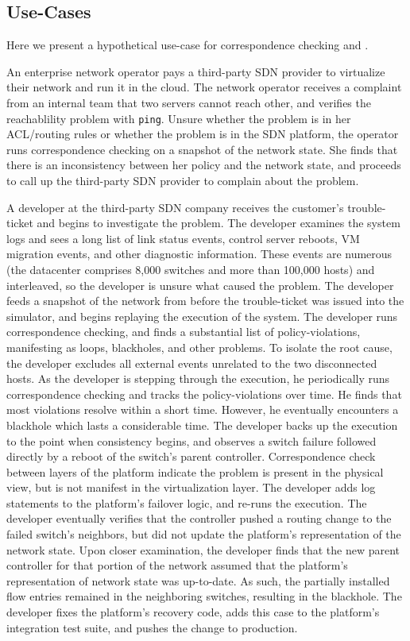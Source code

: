 \subsection{Use-Cases}

Here we present a hypothetical use-case for correspondence checking and
\simulator.

 An enterprise network
operator pays a third-party SDN provider to virtualize their network
and run it in the cloud. The network operator receives a complaint
from an internal team that two servers cannot reach other, and 
verifies the reachablility problem with {\tt ping}. Unsure
whether the problem is in her ACL/routing rules 
or whether the problem is in the SDN platform, the
operator runs correspondence checking on a snapshot of the network state. She
finds that there is an inconsistency between her policy and the network state, 
and proceeds to call up the third-party SDN provider to complain
about the problem.

 A developer at the third-party SDN
company receives the customer's trouble-ticket and begins to investigate the
problem. The developer examines the system logs and sees a
long list of link status events, control server reboots, VM migration events,
and other diagnostic information. These events are numerous (the
datacenter comprises 8,000 switches and more than 100,000 hosts) and
interleaved, so the developer is unsure what caused the problem.
The developer feeds a snapshot of the network from before the
trouble-ticket was issued into the simulator, and
begins replaying the execution of the system. The developer runs
correspondence checking, and finds a substantial list of policy-violations,
manifesting as loops, blackholes, and other problems.
To isolate the root cause, the developer excludes all external events
unrelated to the two disconnected hosts. As the developer is stepping through the execution, he periodically
runs correspondence checking and tracks the policy-violations over time. He
finds that most violations resolve within a short time. However, he
eventually encounters a blackhole which lasts a considerable time. The
developer backs up the execution to the point when consistency begins, and
observes a switch failure followed directly by a reboot of the switch's parent
controller. Correspondence check between layers of the platform indicate the problem is present in the
physical view, but is not manifest in the virtualization layer. The developer adds log statements to the platform's failover
logic, and re-runs the execution. The developer eventually verifies that the
controller pushed a routing change to the failed switch's neighbors, but did
not update the platform's representation of the network state. Upon closer
examination, the developer finds that the new parent controller for that
portion of the network assumed that the platform's
representation of network state was up-to-date. As such, the partially installed flow entries remained
in the neighboring switches, resulting in the blackhole. The developer fixes
the platform's recovery code, adds this case to the platform's integration
test suite, and pushes the change to production. 

